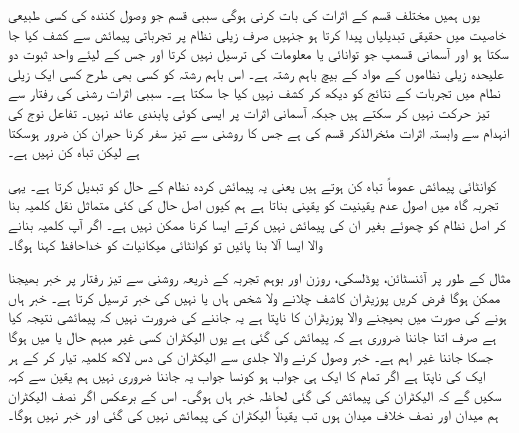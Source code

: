یوں ہمیں مختلف قسم کے اثرات کی بات کرنی ہوگی سببی قسم جو وصول کنندہ کی کسی طبیعی خاصیت میں حقیقی تبدیلیاں پیدا کرتا ہو جنہیں صرف زیلی نظام پر تجرباتی پیمائش سے کشف کیا جا سکتا ہو اور آسمانی قسمپ جو توانائی یا معلومات کی ترسیل نہیں کرتا اور جس کے لیئے واحد ثبوت دو علیحدہ زیلی نظاموں کے مواد کے بیچ باہم رشتہ ہے۔ اس باہم رشتہ کو کسی بھی طرح کسی ایک زیلی نطام میں تجربات کے نتائج کو دیکھ کر کشف نہیں کیا جا سکتا ہے۔ سببی اثرات  رشنی کی رفتار سے تیز حرکت نہیں کر سکتے ہیں جبکہ آسمانی اثرات پر ایسی کوئی پابندی عائد نہیں۔ تفاعل نوج کی انہدام سے وابستہ اثرات مئخرالذکر قسم کی ہے جس کا روشنی سے تیز سفر کرنا حیران کن ضرور ہوسکتا ہے لیکن تباہ کن نہیں ہے۔

کوانٹائی پیمائش عموماً تباہ کن ہوتے ہیں یعنی یہ پیمائش کردہ نظام کے حال کو تبدیل کرتا ہے۔ یہی تجربہ گاہ میں اصول عدم یقینیت کو یقینی بناتا ہے ہم کیوں اصل حال کی کئی متماثل نقل کلمیہ بنا کر اصل نظام کو چھوئے بغیر ان کی پیمائش نہیں کرتے ایسا کرنا ممکن نہیں ہے۔ اگر آپ کلمیہ بنانے والا ایسا آلا بنا پائیں تو کوانٹائی میکانیات کو خداحافظ کہنا ہوگا۔

مثال کے طور پر آئنسٹائن، پوڈلسکی، روزن اور بوہم تجربہ کے ذریعہ روشنی سے تیز رفتار پر خبر بھیجنا ممکن ہوگا فرض کریں پوزیٹران کاشف چلانے ولا شخص ہاں یا نہیں کی خبر ترسیل کرتا ہے۔ خبر ہاں ہونے کی صورت میں بھیجنے والا پوزیٹران کا  ناپتا ہے یہ جاننے کی ضرورت نہیں کہ پیمائشی نتیجہ کیا ہے صرف اتنا جاننا ضروری ہے کہ پیمائش کی گئی ہے یوں الیکٹران کسی غیر مبہم حال  یا  میں ہوگا جسکا جاننا غیر اہم ہے۔ خبر وصول کرنے والا جلدی سے الیکٹران کی دس لاکھ کلمیہ تیار کر کے ہر ایک کی  ناپتا ہے اگر تمام کا ایک ہی جواب ہو کونسا جواب یہ جاننا ضروری نہیں ہم یقین سے کہہ سکیں گے کہ الیکٹران کی پیمائش کی گئی لحاظہ خبر ہاں ہوگی۔ اس کے برعکس اگر نصف الیکٹران ہم میدان اور نصف خلاف میدان ہوں تب یقیناً الیکٹران کی پیمائش نہیں کی گئی اور خبر نہیں ہوگا۔


